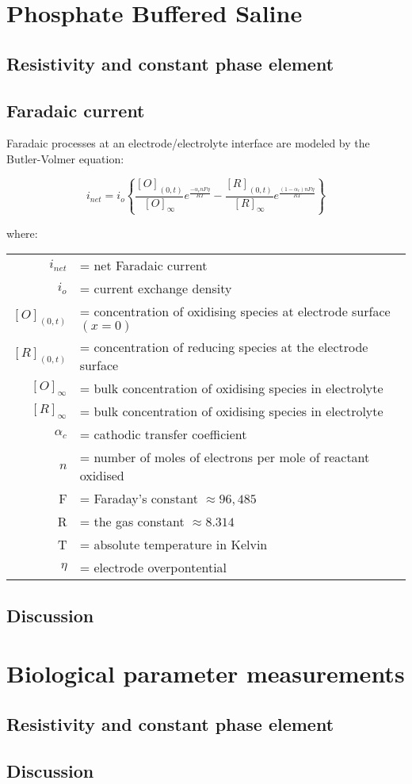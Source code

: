 
\section{Phosphate Buffered Saline}
    \subsection{Resistivity and constant phase element}
    \subsection{Faradaic current}

        Faradaic processes at an electrode/electrolyte interface are modeled
        by the Butler-Volmer equation:

        \begin{equation}
        i_{net}=i_{o}\left\{ \frac{[O]_{(0,t)}}{[O]_{\infty}}e^{\frac{-\alpha_{c}nF\eta}{RT}}-\frac{[R]_{(0,t)}}{[R]_{\infty}}e^{\frac{(1-\alpha_{c})nF\eta}{RT}}\right\}
        \end{equation}


        where:

        \begin{tabular}{rl}
        $i_{net}$ & = net Faradaic current\tabularnewline
        $i_{o}$ & = current exchange density\tabularnewline
        $[O]_{(0,t)}$ & = concentration of oxidising species at electrode surface $(x=0)$\tabularnewline
        $[R]_{(0,t)}$ & = concentration of reducing species at the electrode surface\tabularnewline
        $[O]_{\infty}$ & = bulk concentration of oxidising species in electrolyte\tabularnewline
        $[R]_{\infty}$ & = bulk concentration of oxidising species in electrolyte\tabularnewline
        $\alpha_{c}$ & = cathodic transfer coefficient\tabularnewline
        $n$ & = number of moles of electrons per mole of reactant oxidised\tabularnewline
        F & = Faraday's constant $\approx96,485$\tabularnewline
        R & = the gas constant $\approx8.314$\tabularnewline
        T & = absolute temperature in Kelvin\tabularnewline
        $\eta$ & = electrode overpontential\tabularnewline
        \end{tabular}


    \subsection{Discussion}

\section{Biological parameter measurements}
    \label{sect:sheep_measurements}
    \subsection{Resistivity and constant phase element}
    \subsection{Discussion}
